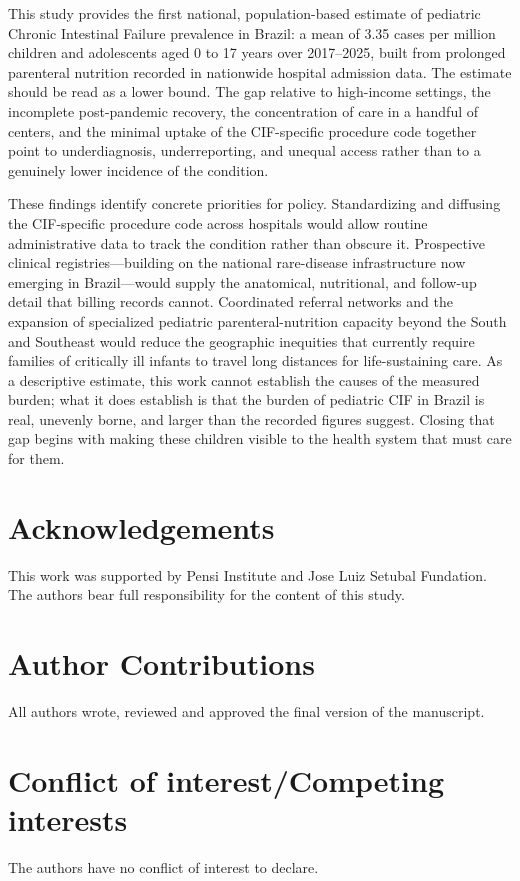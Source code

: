 \documentclass[12pt,a4paper]{article}
\theoremstyle{plain}
\theoremstyle{definition}
\theoremstyle{remark}
\begin{document}
This study provides the first national, population-based estimate of pediatric Chronic Intestinal Failure prevalence in Brazil: a mean of 3.35 cases per million children and adolescents aged 0 to 17 years over 2017--2025, built from prolonged parenteral nutrition recorded in nationwide hospital admission data. The estimate should be read as a lower bound. The gap relative to high-income settings, the incomplete post-pandemic recovery, the concentration of care in a handful of centers, and the minimal uptake of the CIF-specific procedure code together point to underdiagnosis, underreporting, and unequal access rather than to a genuinely lower incidence of the condition.

These findings identify concrete priorities for policy. Standardizing and diffusing the CIF-specific procedure code across hospitals would allow routine administrative data to track the condition rather than obscure it. Prospective clinical registries---building on the national rare-disease infrastructure now emerging in Brazil---would supply the anatomical, nutritional, and follow-up detail that billing records cannot. Coordinated referral networks and the expansion of specialized pediatric parenteral-nutrition capacity beyond the South and Southeast would reduce the geographic inequities that currently require families of critically ill infants to travel long distances for life-sustaining care. As a descriptive estimate, this work cannot establish the causes of the measured burden; what it does establish is that the burden of pediatric CIF in Brazil is real, unevenly borne, and larger than the recorded figures suggest. Closing that gap begins with making these children visible to the health system that must care for them.


\section*{Acknowledgements}

This work was supported by Pensi Institute and Jose Luiz Setubal Fundation. The authors bear full responsibility for the content of this study.

\section*{Author Contributions}

All authors wrote, reviewed and approved the final version of the manuscript.

\section*{Conflict of interest/Competing interests}
The authors have no conflict of interest to declare.
\end{document}

